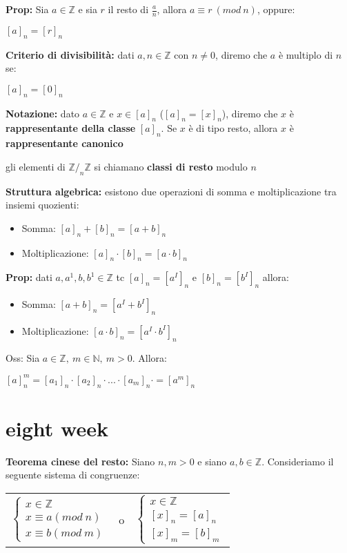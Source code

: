 \documentclass[12pt, a4paper]{article}
\begin{document}
\newpage

\textbf{Prop:} Sia $a\in\mathbb{Z}$ e sia $r$ il resto di $\frac{a}{n}$, allora $a\equiv r\ (mod\ n)$, oppure:
\begin{center}
    $[a]_{n}=[r]_{n}$
\end{center}

\textbf{Criterio di divisibilità:} dati $a,n\in\mathbb{Z}$ con $n\neq 0$, diremo che $a$ è multiplo di $n$ se:
\begin{center}
    $[a]_{n}=[0]_{n}$
\end{center}

\textbf{Notazione:} dato $a\in\mathbb{Z}$ e $x\in [a]_{n}$ ($[a]_{n}=[x]_{n}$), diremo che $x$ è \textbf{rappresentante
della classe} $[a]_{n}$. Se $x$ è di tipo resto, allora $x$ è \textbf{rappresentante canonico}

gli elementi di $\mathbb{Z}/_{n}\mathbb{Z}$ si chiamano \textbf{classi di resto} modulo $n$

\textbf{Struttura algebrica:} esistono due operazioni di somma e moltiplicazione tra insiemi quozienti:
\begin{itemize}
    \item Somma: $[a]_{n}+[b]_{n}=[a+b]_{n}$
    \item Moltiplicazione: $[a]_{n}\cdot [b]_{n}=[a\cdot b]_{n}$
\end{itemize}

\textbf{Prop:} dati $a,a^{1},b,b^{1}\in\mathbb{Z}$ tc $[a]_{n}=[a^{I}]_{n}$ e $[b]_{n}=[b^{I}]_{n}$ allora:
\begin{itemize}
    \item Somma: $[a+b]_{n}=[a^{I}+b^{I}]_{n}$
    \item Moltiplicazione: $[a\cdot b]_{n}=[a^{I}\cdot b^{I}]_{n}$
\end{itemize}

Oss: Sia $a\in\mathbb{Z},\ m\in\mathbb{N},\ m>0$. Allora:
\begin{center}
    $[a]_{n}^{m}=[a_{1}]_{n}\cdot[a_{2}]_{n}\cdot ... \cdot[a_{m}]_{n}\cdot = [a^{m}]_{n}$
\end{center}

\newpage
\section{eight week}
\textbf{Teorema cinese del resto:} Siano $n,m>0$ e siano $a,b\in\mathbb{Z}$. Consideriamo il seguente
sistema di congruenze:
\begin{center}
    \begin{tabular}{ c c c }
        $\begin{cases}
            x\in\mathbb{Z}\\
            x\equiv a(mod\ n)\\
            x\equiv b(mod\ m)
        \end{cases}$
        & o &
        $\begin{cases}
            x\in\mathbb{Z}\\
            [x]_{n}=[a]_{n}\\
            [x]_{m}=[b]_{m}
        \end{cases}$
    \end{tabular}
\end{center}
\end{document}
